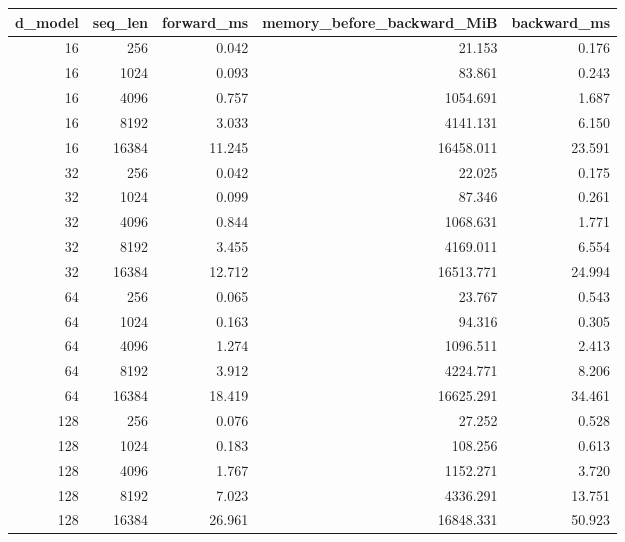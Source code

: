 \begin{tabular}{rrrrr}
\toprule
d_model & seq_len & forward_ms & memory_before_backward_MiB & backward_ms \\
\midrule
16 & 256 & 0.042 & 21.153 & 0.176 \\
16 & 1024 & 0.093 & 83.861 & 0.243 \\
16 & 4096 & 0.757 & 1054.691 & 1.687 \\
16 & 8192 & 3.033 & 4141.131 & 6.150 \\
16 & 16384 & 11.245 & 16458.011 & 23.591 \\
32 & 256 & 0.042 & 22.025 & 0.175 \\
32 & 1024 & 0.099 & 87.346 & 0.261 \\
32 & 4096 & 0.844 & 1068.631 & 1.771 \\
32 & 8192 & 3.455 & 4169.011 & 6.554 \\
32 & 16384 & 12.712 & 16513.771 & 24.994 \\
64 & 256 & 0.065 & 23.767 & 0.543 \\
64 & 1024 & 0.163 & 94.316 & 0.305 \\
64 & 4096 & 1.274 & 1096.511 & 2.413 \\
64 & 8192 & 3.912 & 4224.771 & 8.206 \\
64 & 16384 & 18.419 & 16625.291 & 34.461 \\
128 & 256 & 0.076 & 27.252 & 0.528 \\
128 & 1024 & 0.183 & 108.256 & 0.613 \\
128 & 4096 & 1.767 & 1152.271 & 3.720 \\
128 & 8192 & 7.023 & 4336.291 & 13.751 \\
128 & 16384 & 26.961 & 16848.331 & 50.923 \\
\bottomrule
\end{tabular}
